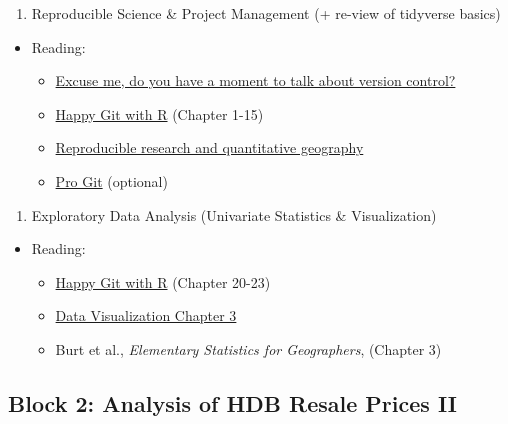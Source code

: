 \documentclass[]{book}
\providecommand{\tightlist}{%
  \setlength{\itemsep}{0pt}\setlength{\parskip}{0pt}}
\begin{document}
\begin{enumerate}
\def\labelenumi{\arabic{enumi}.}
\tightlist
\item
  Reproducible Science \& Project Management (+ re-view of tidyverse basics)
\end{enumerate}

\begin{itemize}
\tightlist
\item
  Reading:

  \begin{itemize}
  \tightlist
  \item
    \href{https://peerj.com/preprints/3159/}{Excuse me, do you have a moment to talk about version control?}
  \item
    \href{https://happygitwithr.com}{Happy Git with R} (Chapter 1-15)
  \item
    \href{https://journals.sagepub.com/doi/abs/10.1177/0309132515599625}{Reproducible research and quantitative geography}
  \item
    \href{https://git-scm.com/book/en/v2}{Pro Git} (optional)
  \end{itemize}
\end{itemize}

\begin{enumerate}
\def\labelenumi{\arabic{enumi}.}
\setcounter{enumi}{1}
\tightlist
\item
  Exploratory Data Analysis (Univariate Statistics \& Visualization)
\end{enumerate}

\begin{itemize}
\tightlist
\item
  Reading:

  \begin{itemize}
  \tightlist
  \item
    \href{https://happygitwithr.com}{Happy Git with R} (Chapter 20-23)
  \item
    \href{https://socviz.co/makeplot.html\#makeplot}{Data Visualization Chapter 3}
  \item
    Burt et al., \emph{Elementary Statistics for Geographers}, (Chapter 3)
  \end{itemize}
\end{itemize}

\hypertarget{block-2-analysis-of-hdb-resale-prices-ii}{%
\subsection{Block 2: Analysis of HDB Resale Prices II}\label{block-2-analysis-of-hdb-resale-prices-ii}}
\end{document}
